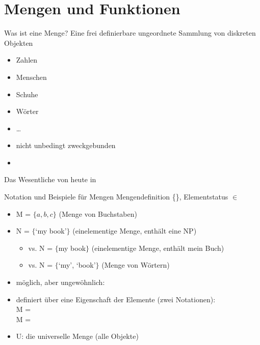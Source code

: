 \section{Mengen und Funktionen}

\begin{frame}
  {Was ist eine Menge?}
  \onslide<+->
  \onslide<+->
  Eine \alert{frei definierbare ungeordnete Sammlung von diskreten Objekten}\\
  \begin{itemize}[<+->]
    \item Zahlen
    \item Menschen
    \item Schuhe
    \item Wörter
    \item \ldots
      \Halbzeile
    \item nicht unbedingt zweckgebunden
    \item {}
  \end{itemize}
  \centering
  \Zeile
  \onslide<+->
  Das Wesentliche von heute in \citet[Kapitel~1--4]{ParteeEa1990}
\end{frame}

\begin{frame}
  {Notation und Beispiele für Mengen}
  \onslide<+->
  \onslide<+->
  Mengendefinition \alert{\{\}}, Elementstatus $\in$\\
  \Zeile
  \begin{itemize}[<+->]
    \item M = \alert{$\{a,b,c\}$} (Menge von Buchstaben)
      \Halbzeile
    \item N = \alert{$\{$`my book'$\}$} (einelementige Menge, enthält eine NP)
      \begin{itemize}[<+->]
        \item vs. \alert{N = $\{$my book$\}$} (einelementige Menge, enthält mein Buch)
        \item vs. \alert{N = $\{$`my', `book'$\}$} (Menge von Wörtern)
      \end{itemize}
      \Halbzeile
    \item möglich, aber ungewöhnlich: 
      \Halbzeile
    \item definiert über eine Eigenschaft der Elemente (zwei Notationen):\\
      M = \\
      M = 
      \Halbzeile
    \item \alert{U}: die universelle Menge (alle Objekte)
  \end{itemize}
\end{frame}

